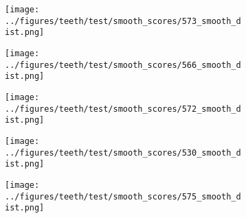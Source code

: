 \begin{figure}[h!]
\begin{subfigure}{0.15\textwidth}
		\end{subfigure}
	\begin{subfigure}{0.15\textwidth}
			\centering
			\texttt{[image: ../figures/teeth/test/smooth\_scores/573\_smooth\_dist.png]}
			\label{fig:1}
		\end{subfigure}
	\begin{subfigure}{0.15\textwidth}
			\centering
			\texttt{[image: ../figures/teeth/test/smooth\_scores/566\_smooth\_dist.png]}
			\label{fig:1}
		\end{subfigure}
	\begin{subfigure}{0.15\textwidth}
			\centering
			\texttt{[image: ../figures/teeth/test/smooth\_scores/572\_smooth\_dist.png]}
			\label{fig:1}
		\end{subfigure}
	\begin{subfigure}{0.15\textwidth}
			\centering
			\texttt{[image: ../figures/teeth/test/smooth\_scores/530\_smooth\_dist.png]}
			\label{fig:1}
		\end{subfigure}
	\begin{subfigure}{0.15\textwidth}
			\centering
			\texttt{[image: ../figures/teeth/test/smooth\_scores/575\_smooth\_dist.png]}
			\label{fig:1}
		\end{subfigure}
		\vspace{-0.5cm}
	\caption{}\label{fig:teeth}
\end{figure}
\vspace{-0.5cm}